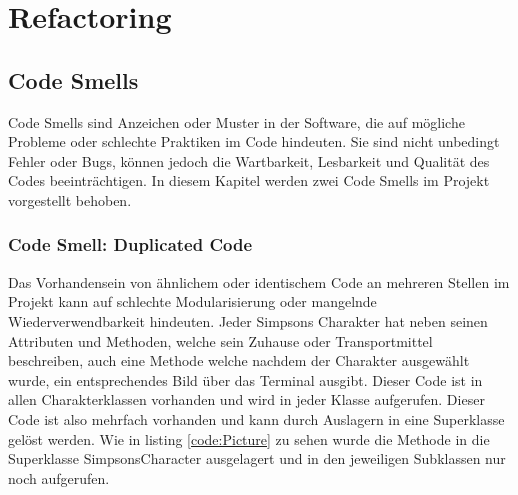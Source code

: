 \chapter{Refactoring}

\section{Code Smells}
Code Smells sind Anzeichen oder Muster in der Software, die auf mögliche Probleme oder schlechte Praktiken im Code hindeuten. Sie sind nicht unbedingt Fehler oder Bugs, können jedoch die Wartbarkeit, Lesbarkeit und Qualität des Codes beeinträchtigen. In diesem Kapitel werden zwei Code Smells im Projekt vorgestellt behoben.
\subsection{Code Smell: Duplicated Code}
Das Vorhandensein von ähnlichem oder identischem Code an mehreren Stellen im Projekt kann auf schlechte Modularisierung oder mangelnde Wiederverwendbarkeit hindeuten. Jeder Simpsons Charakter hat neben seinen Attributen und Methoden, welche sein Zuhause oder Transportmittel beschreiben, auch eine Methode welche nachdem der Charakter ausgewählt wurde, ein entsprechendes Bild über das Terminal ausgibt. Dieser Code ist in allen Charakterklassen vorhanden und wird in jeder Klasse aufgerufen. Dieser Code ist also mehrfach vorhanden und kann durch Auslagern in eine Superklasse gelöst werden. Wie in listing \ref{code:Picture} zu sehen wurde die Methode in die Superklasse SimpsonsCharacter ausgelagert und in den jeweiligen Subklassen nur noch aufgerufen.
 


